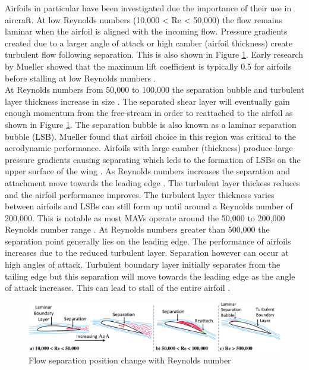 Airfoils in particular have been investigated due the importance of their use in aircraft. At low Reynolds numbers (10,000 < Re < 50,000) the flow remains laminar when the airfoil is aligned with the incoming flow. Pressure gradients created due to a larger angle of attack or high camber (airfoil thickness) create turbulent flow following separation. This is also shown in Figure \ref{fig:Re3}. Early research by Mueller showed that the maximum lift coefficient is typically 0.5 for airfoils before stalling at low Reynolds numbers \cite{Mueller1985}. \\
At Reynolds numbers from 50,000 to 100,000 the separation bubble and turbulent layer thickness increase in size \cite{Winslow2018}. The separated shear layer will eventually gain enough momentum from the free-stream in order to reattached to the airfoil as shown in Figure \ref{fig:Re3}. The separation bubble is also known as a laminar separation bubble (LSB). Mueller found that airfoil choice in this region was critical to the aerodynamic performance. Airfoils with large camber (thickness) produce large pressure gradients causing separating which leds to the formation of LSBs on the upper surface of the wing \cite{Mueller1985}. As Reynolds numbers increases the separation and attachment move towards the leading edge \cite{Winslow2018}. The turbulent layer thickess reduces and the airfoil performance improves. The turbulent layer thickness varies between airfoils and LSBs can still form up until around a Reynolds number of 200,000. This is notable as most MAVs operate around the 50,000 to 200,000 Reynolds number range \cite{Cosyn2006}. At Reynolds numbers greater than 500,000 the separation point generally lies on the leading edge. The performance of airfoils increases due to the reduced turbulent layer. Separation however can occur at high angles of attack. Turbulent boundary layer initially separates from the tailing edge but this separation will move towards the leading edge as the angle of attack increases. This can lead to stall of the entire airfoil \cite{Winslow2018}. 

\begin{figure}[H]
    \centering
    \includegraphics[width = \linewidth]{02_Background/Figs/airfoil.jpeg}
   \caption{Flow separation position change with Reynolds number \cite{Winslow2018}}
    \label{fig:Re3}
\end{figure}

